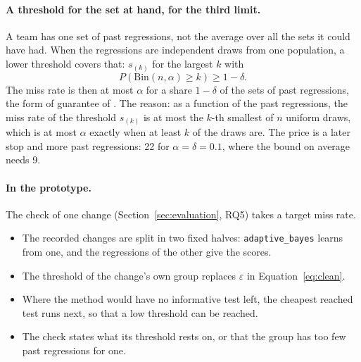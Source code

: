 \documentclass[11pt,a4paper]{article}
\newcommand{\strat}[1]{\texttt{#1}}
\begin{document}
\paragraph{A threshold for the set at hand, for the third limit.} A team has one set of past regressions, not the
average over all the sets it could have had. When the regressions are independent draws from one population, a
lower threshold covers that: $s_{(k)}$ for the largest $k$ with
\begin{equation}
  P(\mathrm{Bin}(n, \alpha) \ge k) \ge 1 - \delta .
  \label{eq:atHand}
\end{equation}
The miss rate is then at most $\alpha$ for a share $1 - \delta$ of the sets of past regressions, the form of
guarantee of \cite{angelopoulos2025ltt}. The reason: as a function of the past regressions, the miss rate of the
threshold $s_{(k)}$ is at most the $k$-th smallest of $n$ uniform draws, which is at most $\alpha$ exactly when at
least $k$ of the draws are. The price is a later stop and more past regressions: 22 for $\alpha = \delta = 0.1$,
where the bound on average needs 9.

\paragraph{In the prototype.} The check of one change (Section~\ref{sec:evaluation}, RQ5) takes a target miss
rate.
\begin{itemize}
  \item The recorded changes are split in two fixed halves: \strat{adaptive\_bayes} learns from one, and the
        regressions of the other give the scores.
  \item The threshold of the change's own group replaces $\varepsilon$ in Equation~\ref{eq:clean}.
  \item Where the method would have no informative test left, the cheapest reached test runs next, so that a low
        threshold can be reached.
  \item The check states what its threshold rests on, or that the group has too few past regressions for one.
\end{itemize}
\end{document}
